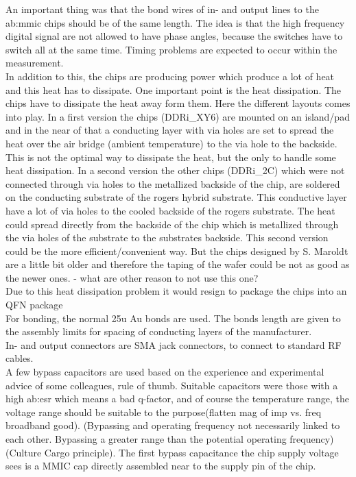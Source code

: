 An important thing was that the bond wires of in- and output lines to the \gls{ab:mmic} chips should be of the same length. The idea is that the high frequency digital signal are not allowed to have phase angles, because the switches have to switch all at the same time. Timing problems are expected to occur within the measurement. \\
In addition to this, the chips are producing power which produce a lot of heat and this heat has to dissipate.
One important point is the heat dissipation. The chips have to dissipate the heat away form them. 
Here the different layouts comes into play.
In a first version the chips (DDRi\_XY6) are mounted on an island/pad and in the near of that a conducting layer with via holes are set to spread the heat over the air bridge (ambient temperature) to the via hole to the backside. 
This is not the optimal way to dissipate the heat, but the only to handle some heat dissipation.
In a second version the other chips (DDRi\_2C) which were not connected through via holes to the metallized backside of the chip, are soldered on the conducting substrate of the rogers hybrid substrate. This conductive layer have a lot of via holes to the cooled backside of the rogers substrate. 
The heat could spread directly from the backside of the chip which is metallized through the via holes of the substrate to the substrates backside.
This second version could be the more efficient/convenient way.
But the chips designed by S. Maroldt are a little bit older and therefore the taping of the wafer could be not as good as the newer ones. - what are other reason to not use this one?\\
 Due to this heat dissipation problem it would resign to package the chips into an QFN package\\
For bonding, the normal 25u Au bonds are used. The bonds length are given to the assembly limits for spacing of conducting layers of the manufacturer.\\
In- and output connectors are SMA jack connectors, to connect to standard RF cables.\\ 
A few bypass capacitors are used based on the experience and experimental advice of some colleagues, rule of thumb. 
Suitable capacitors were those with a high \gls{ab:esr} which means a bad q-factor, and of course the temperature range, the voltage range should be suitable to the purpose(flatten mag of imp vs. freq broadband good).
(Bypassing and operating frequency not necessarily linked to each other. Bypassing a greater range than the potential operating frequency) (Culture Cargo principle). The first bypass capacitance the chip supply voltage sees is a MMIC cap directly assembled near to the supply pin of the chip.\\
